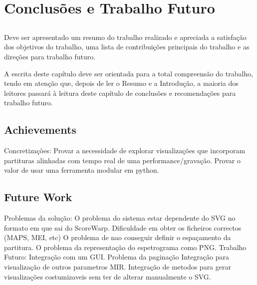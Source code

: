 \chapter{Conclusões e Trabalho Futuro} \label{chap:concl}

\section*{}

Deve ser apresentado um resumo do trabalho realizado e apreciada a
satisfação dos objetivos do trabalho, uma lista de contribuições
principais do trabalho e as direções para trabalho futuro.

A escrita deste capítulo deve ser orientada para a total compreensão
do trabalho, tendo em atenção que, depois de ler o Resumo e a
Introdução, a maioria dos leitores passará à leitura deste capítulo de
conclusões e recomendações para trabalho futuro.

\section{Achievements}

Concretizações:
	Provar a necessidade de explorar visualizações que incorporam partituras alinhadas com tempo real de uma performance/gravação.
	Provar o valor de usar uma ferramenta modular em python.

\section{Future Work}

Problemas da solução:
	O problema do sistema estar dependente do SVG no formato em que sai do ScoreWarp.
	Dificuldade em obter os ficheiros correctos (MAPS, MEI, etc)
	O problema de nao conseguir definir o espaçamento da partitura.
	O problema da representação do espetrograma como PNG.
Trabalho Futuro:
	Integração com um GUI.
	Problema da paginação
	Integração para visualização de outros parametros MIR.
	Integração de metodos para gerar visualizações costumizaveis sem ter de alterar manualmente o SVG.


\vspace*{12mm}
